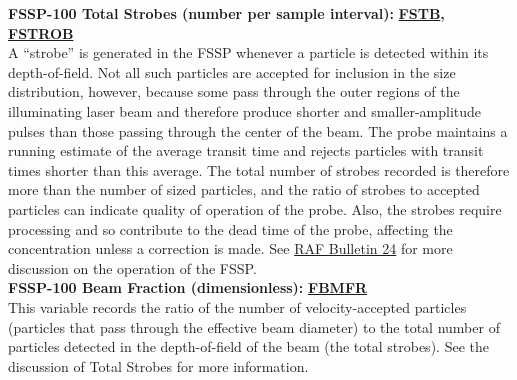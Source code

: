 \begin{hangparagraphs}
\textbf{FSSP-100 Total Strobes (number per sample interval): }\textbf{\uline{FSTB}}\textbf{,
}\textbf{\uline{FSTROB}}\\
A ``strobe'' is generated in the FSSP
whenever a particle is detected within its depth-of-field. Not all
such particles are accepted for inclusion in the size distribution,
however, because some pass through the outer regions of the illuminating
laser beam and therefore produce shorter and smaller-amplitude pulses
than those passing through the center of the beam. The probe maintains
a running estimate of the average transit time and rejects particles
with transit times shorter than this average. The total number of
strobes recorded is therefore more than the number of sized particles,
and the ratio of strobes to accepted particles can indicate quality
of operation of the probe. Also, the strobes require processing and
so contribute to the dead time of the probe, affecting the concentration
unless a correction is made. See \href{http://www.eol.ucar.edu/raf/Bulletins/bulletin24.html}{RAF Bulletin 24}
for more discussion on the operation of the FSSP.\\


\textbf{FSSP-100 Beam Fraction (dimensionless): }\textbf{\uline{FBMFR}}\\
This variable records the ratio of
the number of velocity-accepted particles (particles that pass through
the effective beam diameter) to the total number of particles detected
in the depth-of-field of the beam (the total strobes). See the discussion
of Total Strobes for more information.\\
 \\
\\



\end{hangparagraphs}
